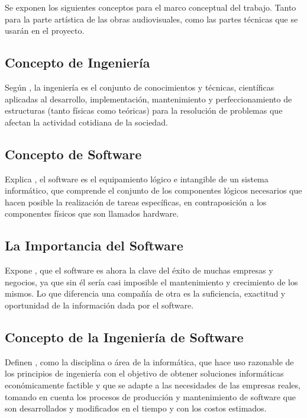 \documentclass[12pt]{article}
\begin{document}
	\hspace{1.27cm}Se exponen los siguientes conceptos para el marco conceptual del trabajo. Tanto para la parte artística de las obras audiovisuales, como las partes técnicas que se usarán en el proyecto.

	\subsection{Concepto de Ingeniería}

	\hspace{1.27cm}Según \textcite{maida_metodologias_2015}, la ingeniería es el conjunto de conocimientos y técnicas, científicas aplicadas al desarrollo,
	implementación, mantenimiento y perfeccionamiento de estructuras (tanto físicas como teóricas)
	para la resolución de problemas que afectan la actividad cotidiana de la sociedad.

	\subsection{Concepto de Software}

	\hspace{1.27cm}Explica \textcite{maida_metodologias_2015}, el software es el equipamiento lógico e intangible de un sistema informático, que comprende el conjunto de los componentes lógicos necesarios que hacen posible la realización de tareas específicas,
	en contraposición a los componentes físicos que son llamados hardware.

	\subsection{La Importancia del Software}

	\hspace{1.27cm}Expone \textcite{maida_metodologias_2015}, que el software es ahora la clave del éxito de muchas empresas y negocios, ya que sin él sería casi imposible el mantenimiento y crecimiento de los mismos. Lo que diferencia una compañía de otra es la suficiencia, exactitud y oportunidad de la información dada por el software.

	\subsection{Concepto de la Ingeniería de Software}

	\hspace{1.27cm}Definen \textcite{maida_metodologias_2015}, como la disciplina o área de la informática, que hace uso razonable de los principios de ingeniería con el objetivo de obtener soluciones informáticas económicamente factible y que se adapte a las necesidades de las empresas reales, tomando en cuenta los procesos de producción y mantenimiento de software que son desarrollados y modificados en el tiempo y con los costos estimados.
\end{document}
